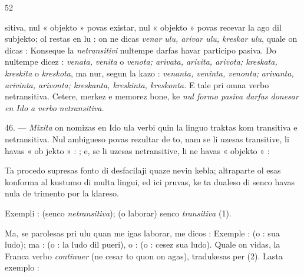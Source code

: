 \begin{VUpage}[56]{52}

\VUcontinue sitiva, nul « objekto » povas existar, nul « objekto » povas\nl
recevar la ago dil subjekto; ol restas en lu : on ne dicas\nl
\textit{venar ulu, arivar ulu, kreskar ulu}, quale on dicas : \nl
{} Konseque la \textit{netransitivi} nultempe\nl
darfas havar participo pasiva. Do nultempe dicez : \textit{venata,}\nl
\textit{venita} o \textit{venota; arivata, arivita, arivota; kreskata, kreskita}\nl
o \textit{kreskota}, ma nur, segun la kazo : \textit{venanta, veninta, venonta;}\nl
\textit{arivanta, arivinta, arivonta; kreskanta, kreskinta, kreskonta.}\nl
E tale pri omna verbo netransitiva. Cetere, merkez e memorez\nl
bone, ke \textit{nul formo pasiva darfas donesar en Ido a verbo}\nl
\textit{netransitiva.}

\VUblanc{6.48pt}%
46. --- \textit{Mixita} on nomizas en Ido ula verbi quin la linguo\nl
traktas kom transitiva e netransitiva. Nul ambigueso povas\nl
rezultar de to, nam se li uzesas transitive, li havas « ob\cc
jekto » : ; e, se li uzesas\nl
netransitive, li ne havas « objekto » : \nl
{}

Ta procedo supresas fonto di desfacilaji quaze nevin\cc
kebla; altraparte ol esas konforma al kustumo di multa\nl
lingui, ed ici pruvas, ke ta dualeso di senco havas nula de\cc
trimento por la klareso.

Exempli : \nl
{} (senco \textit{netransitiva}); \nl
{} (o laborar) senco\nl
\textit{transitiva} (1).

Ma, se parolesas pri ulu quan me igas laborar, me dicos :\nl
{}\nl
Exemple :  (o : sua ludo); ma : \nl
{} (o : la ludo dil pueri), o : \nl
{} (o : cesez sua ludo). Quale on vidas, la Franca\nl
verbo \textit{continuer} (ne cesar to quon on agas), tradukesas per\nl
{} (2). Lasta exemplo : \nl
{}
\end{VUpage}
